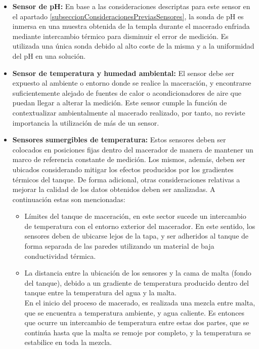     \begin{itemize}
    
        \item \textbf{Sensor de pH: }En base a las consideraciones descriptas para este sensor en el apartado \ref{subseccionConsideracionesPreviasSensores}, la sonda de pH es inmersa en una muestra obtenida de la templa durante el macerado enfriada mediante intercambio térmico para disminuir el error de medición. Es utilizada una única sonda debido al alto coste de la misma y a la uniformidad del pH en una solución.
        
        \item \textbf{Sensor de temperatura y humedad ambiental: } El sensor debe ser expuesto al ambiente o entorno donde se realice la maceración, y encontrarse suficientemente alejado de fuentes de calor o acondicionadores de aire que puedan llegar a alterar la medición. Este sensor cumple la función de contextualizar ambientalmente al macerado realizado, por tanto, no reviste importancia la utilización de más de un sensor.
        
        \item \textbf{Sensores sumergibles de temperatura: } Estos sensores deben ser colocados en posiciones fijas dentro del macerador de manera de mantener un marco de referencia constante de medición. Los mismos, además, deben ser ubicados considerando mitigar los efectos producidos por los gradientes térmicos del tanque. De forma adicional, otras consideraciones relativas a mejorar la calidad de los datos obtenidos deben ser analizadas. A continuación estas son mencionadas:
        \begin{itemize}
        
            \item Límites del tanque de maceración, en este sector sucede un intercambio de temperatura con el entorno exterior del macerador. En este sentido, los sensores deben de ubicarse lejos de la tapa, y ser adheridos al tanque de forma separada de las paredes utilizando un material de baja conductividad térmica.
            
            \item 
            La distancia entre la ubicación de los sensores y la cama de malta (fondo del tanque), debido a un gradiente de temperatura producido dentro del tanque entre la temperatura del agua y la malta.\\
            En el inicio del proceso de macerado, es realizada una mezcla entre malta, que se encuentra a temperatura ambiente, y agua caliente. Es entonces que ocurre un intercambio de temperatura entre estas dos partes, que se continúa hasta que la malta se remoje por completo, y la temperatura se estabilice en toda la mezcla.
            

\end{itemize}
\end{itemize}
